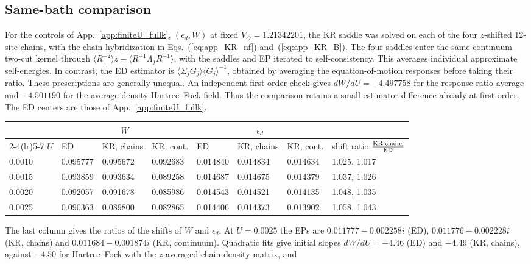 \documentclass[%
  aps,physrev,onecolumn,10pt,amsmath,amssymb,superscriptaddress,longbibliography,floatfix
]{revtex4-2}
\begin{document}
\subsection{Same-bath comparison}
\label{app:KR_bath}
For the controls of App.~\ref{app:finiteU_fullk}, $(\epsilon_d,W)$ at fixed
$V_O=1.21342201$, the KR saddle was solved on each of the four $z$-shifted
12-site chains, with the chain hybridization in Eqs.~(\ref{eq:app_KR_nf})
and~(\ref{eq:app_KR_B}).  The four saddles enter the same continuum two-cut
kernel through $\langle R^{-2}\rangle z-\langle R^{-1}\Lambda_f R^{-1}\rangle$,
with the saddles and EP iterated to self-consistency.  This averages
individual approximate self-energies.  In contrast, the ED estimator is
$\langle\Sigma_jG_j\rangle\langle G_j\rangle^{-1}$, obtained by averaging
the equation-of-motion responses before taking their ratio.  These
prescriptions are generally unequal.  An independent first-order check
gives $dW/dU=-4.497758$ for the response-ratio average and $-4.501190$ for
the average-density Hartree--Fock field.  Thus the comparison retains a
small estimator difference already at first order.  The ED centers are
those of App.~\ref{app:finiteU_fullk}.
\begin{center}
\begin{tabular}{@{}llllllll@{}}
\toprule
 & \multicolumn{3}{c}{$W$} & \multicolumn{3}{c}{$\epsilon_d$} & \\
\cmidrule(lr){2-4}\cmidrule(lr){5-7}
$U$ & ED & KR, chains & KR, cont. & ED & KR, chains & KR, cont. & shift ratio $\frac{\rm KR,chains}{\rm ED}$\\
\midrule
0.0010 & 0.095777 & 0.095672 & 0.092683 & 0.014840 & 0.014834 & 0.014634 & 1.025, 1.017\\
0.0015 & 0.093859 & 0.093634 & 0.089258 & 0.014687 & 0.014675 & 0.014379 & 1.037, 1.026\\
0.0020 & 0.092057 & 0.091678 & 0.085986 & 0.014543 & 0.014521 & 0.014135 & 1.048, 1.035\\
0.0025 & 0.090363 & 0.089800 & 0.082865 & 0.014406 & 0.014373 & 0.013902 & 1.058, 1.043\\
\bottomrule
\end{tabular}
\end{center}
The last column gives the ratios of the shifts of $W$ and $\epsilon_d$.  At
$U=0.0025$ the EPs are $0.011777-0.002258i$ (ED), $0.011776-0.002228i$ (KR,
chains) and $0.011684-0.001874i$ (KR, continuum).  Quadratic fits give initial
slopes $dW/dU=-4.46$ (ED) and $-4.49$ (KR, chains), against $-4.50$ for
Hartree--Fock with the $z$-averaged chain density matrix, and
\end{document}
